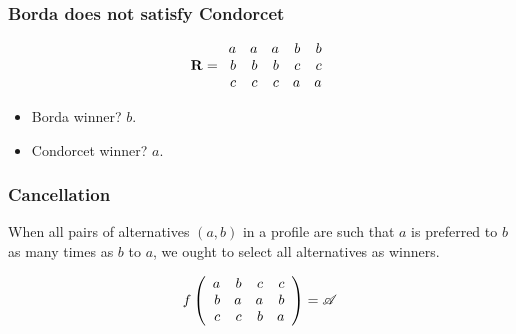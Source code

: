 \documentclass[french,english]{beamer}
\begin{document}
\begin{frame}
	\frametitle{Borda does not satisfy Condorcet}
	\begin{equation}
		\mathbf{R} =
		\begin{array}{rrrrr}
			a	&	a	&	a	&	b	&	b\\
			b	&	b	&	b	&	c	&	c\\
			c	&	c	&	c	&	a	&	a
		\end{array}
	\end{equation}
	\begin{itemize}
		\item Borda winner? \pause $b$.
		\item Condorcet winner? \pause $a$.
	\end{itemize}
\end{frame}

\begin{frame}
	\frametitle{Cancellation}
	\begin{definition}[Cancellation]
		When all pairs of alternatives $(a, b)$ in a profile are such that $a$ is preferred to $b$ as many times as $b$ to $a$, we ought to select all alternatives as winners.
	\end{definition}
	\begin{example}
		\begin{equation}
			f\left(%
			\begin{array}{rrrr}
				a&b&c&c\\
				b&a&a&b\\
				c&c&b&a\\
			\end{array}\right) = \allalts
		\end{equation}
	\end{example}
\end{frame}
\end{document}
